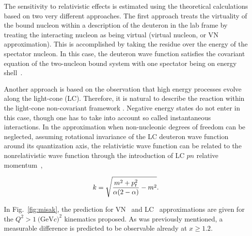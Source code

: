 The sensitivity to relativistic effects is estimated using the theoretical calculations based on two 
very different approaches.   The first approach treats the  virtuality of the bound nucleon within a
description of the deuteron in the lab frame by treating the interacting nucleon as being 
virtual (virtual nucleon, or VN approximation). This is accomplished by taking the residue over the energy of the spectator nucleon.
In this case, the deuteron wave function satisfies the covariant equation of the two-nucleon bound system 
with one spectator being on energy shell~\cite{Sargsian:2009hf,Gross:2010qm}.

Another approach is based on the observation that high energy processes
evolve along the light-cone (LC).  Therefore, it is natural to describe the 
reaction within the light-cone non-covariant framework \cite{Frankfurt:1981mk}. 
Negative energy states do not enter in this case, though one has to take into 
account so called instantaneous interactions.
In the approximation when non-nucleonic degrees of freedom 
can be neglected, assuming rotational invariance of the LC deuteron wave function around its quantization axis, the relativistic wave function can be related to the nonrelativistic wave function through the introduction of LC $pn$ relative momentum~\cite{Frankfurt:1981mk, Miller:2009fc},

\begin{equation}
k=\sqrt{{m^2+p_t^2\over \alpha(2-\alpha)} - m^2}.
\end{equation}

In Fig.~\ref{fig:misak}, the prediction for VN~\cite{Sargsian:2009hf} and LC~\cite{Frankfurt:1993sp} approximations are given 
for the $Q^2>1\mathrm{~(GeV}c)^2$ kinematics proposed. As was previously mentioned, a measurable 
difference is predicted to be observable already at $x\ge 1.2$.
 
 

